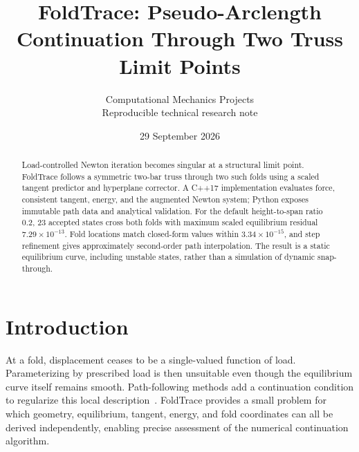 \documentclass[10pt,a4paper]{article}
\title{\vspace{-1.3cm}\LARGE FoldTrace: Pseudo-Arclength Continuation Through Two Truss Limit Points}
\author{\small Computational Mechanics Projects\\\small Reproducible technical research note}
\date{\small 29 September 2026}
\begin{document}
\maketitle\thispagestyle{fancy}

\begin{abstract}
Load-controlled Newton iteration becomes singular at a structural limit point. FoldTrace follows a symmetric two-bar truss through two such folds using a scaled tangent predictor and hyperplane corrector. A C++17 implementation evaluates force, consistent tangent, energy, and the augmented Newton system; Python exposes immutable path data and analytical validation. For the default height-to-span ratio 0.2, 23 accepted states cross both folds with maximum scaled equilibrium residual $7.29\times10^{-13}$. Fold locations match closed-form values within $3.34\times10^{-15}$, and step refinement gives approximately second-order path interpolation. The result is a static equilibrium curve, including unstable states, rather than a simulation of dynamic snap-through.
\end{abstract}
\section{Introduction}
At a fold, displacement ceases to be a single-valued function of load. Parameterizing by prescribed load is then unsuitable even though the equilibrium curve itself remains smooth. Path-following methods add a continuation condition to regularize this local description~\cite{riks}. FoldTrace provides a small problem for which geometry, equilibrium, tangent, energy, and fold coordinates can all be derived independently, enabling precise assessment of the numerical continuation algorithm.
\end{document}
